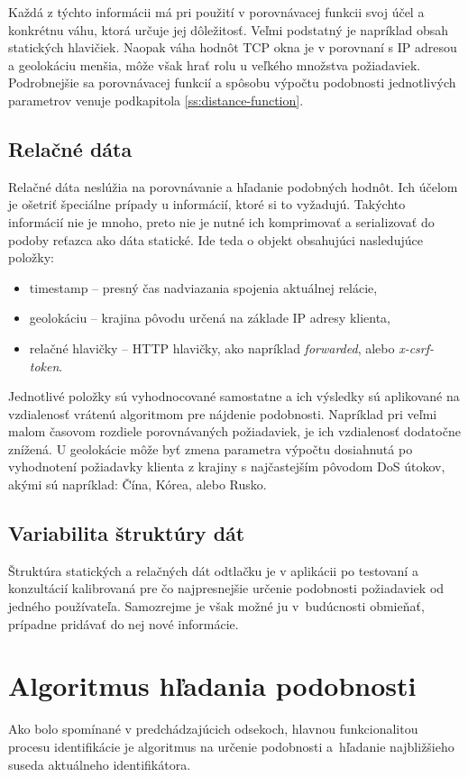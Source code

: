 \documentclass[
  digital, %
  oneside, %
  table,   %
  lof,     %
  nolot,   %
  nocover
]{fithesis3}
\begin{document}
Každá z týchto informácii má pri použití v porovnávacej funkcii svoj účel a
konkrétnu váhu, ktorá určuje jej dôležitosť. Veľmi podstatný je napríklad obsah statických hlavičiek. Naopak
váha hodnôt TCP okna je v porovnaní s IP adresou a geolokáciu menšia, môže však
hrať rolu u veľkého množstva požiadaviek. Podrobnejšie sa porovnávacej funkcií a
spôsobu výpočtu podobnosti jednotlivých parametrov venuje podkapitola \ref{ss:distance-function}.

\subsection{Relačné dáta}
Relačné dáta neslúžia na porovnávanie a hľadanie podobných hodnôt. Ich účelom
je ošetriť špeciálne prípady u informácií, ktoré si to vyžadujú. Takýchto
informácií nie je mnoho, preto nie je nutné ich komprimovať a serializovať do podoby reťazca ako
dáta statické.
Ide teda o objekt obsahujúci nasledujúce položky:
\begin{itemize}
    \item timestamp -- presný čas nadviazania spojenia aktuálnej relácie,
    \item geolokáciu -- krajina pôvodu určená na základe IP adresy klienta,
    \item relačné hlavičky -- HTTP hlavičky, ako napríklad
    \textit{forwarded}, alebo \textit{x-csrf-token}. 
\end{itemize}

Jednotlivé položky sú vyhodnocované samostatne a ich výsledky sú aplikované na
vzdialenosť vrátenú algoritmom pre nájdenie podobnosti. Napríklad pri veľmi
malom časovom rozdiele porovnávaných požiadaviek, je ich vzdialenosť dodatočne
znížená. U geolokácie môže byť zmena parametra výpočtu dosiahnutá po vyhodnotení požiadavky
klienta z krajiny s najčastejším pôvodom DoS útokov, akými sú napríklad: Čína,
Kórea, alebo Rusko.

\subsection{Variabilita štruktúry dát}
Štruktúra statických a relačných dát odtlačku je v aplikácii po testovaní a konzultácií kalibrovaná
pre čo najpresnejšie určenie podobnosti požiadaviek od jedného používateľa.
Samozrejme je však možné ju v~budúcnosti obmieňať, prípadne pridávať do nej
nové informácie.

\section{Algoritmus hľadania podobnosti}
\label{s:similarity-search}
Ako bolo spomínané v predchádzajúcich odsekoch, hlavnou funkcionalitou procesu identifikácie je
algoritmus na určenie podobnosti a~hľadanie najbližšieho suseda aktuálneho
identifikátora. 
\end{document}

